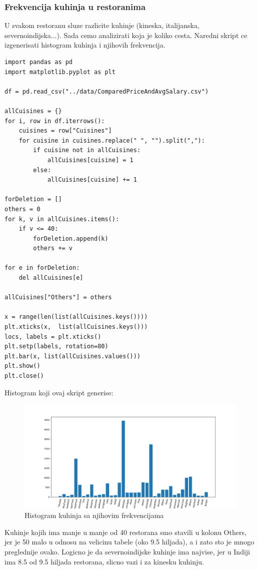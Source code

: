 \documentclass[11pt]{article} %
\begin{document}
\subsubsection{Frekvencija kuhinja u restoranima}
U svakom restoranu sluze razlicite kuhinje (kineska, italijanska, severnoindijska...). Sada cemo analizirati koja je koliko cesta. Naredni skript ce izgenerisati 
histogram kuhinja i njihovih frekvencija.
\begin{lstlisting}
import pandas as pd
import matplotlib.pyplot as plt

df = pd.read_csv("../data/ComparedPriceAndAvgSalary.csv")

allCuisines = {}
for i, row in df.iterrows():
    cuisines = row["Cuisines"]
    for cuisine in cuisines.replace(" ", "").split(","):
        if cuisine not in allCuisines:
            allCuisines[cuisine] = 1
        else:
            allCuisines[cuisine] += 1

forDeletion = []
others = 0
for k, v in allCuisines.items():
    if v <= 40:
        forDeletion.append(k)
        others += v

for e in forDeletion:
    del allCuisines[e]

allCuisines["Others"] = others

x = range(len(list(allCuisines.keys())))
plt.xticks(x,  list(allCuisines.keys()))
locs, labels = plt.xticks()
plt.setp(labels, rotation=80)
plt.bar(x, list(allCuisines.values()))
plt.show()
plt.close()
\end{lstlisting}
\newpage
Histogram koji ovaj skript generise:
\begin{figure}[h!]
	\centering
	\includegraphics[width=1.2\textwidth]{../images/cuisineHistogram}
	\caption{Histogram kuhinja sa njihovim frekvencijama}
\end{figure}
\newline
Kuhinje kojih ima manje u manje od 40 restorana smo stavili u kolonu Others, jer je 50 malo u odnosu na velicinu tabele (oko 9.5 hiljada), a i zato sto je mnogo 
preglednije ovako. 
Logicno je da severnoindijske kuhinje ima najvise, jer u Indiji ima 8.5 od 9.5 hiljada restorana, slicno vazi i za kinesku kuhinju.
\end{document}
